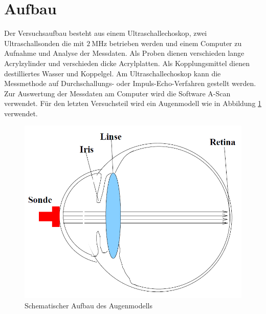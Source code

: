 \section{Aufbau}
\label{sec:Aufbau}

Der Versuchsaufbau besteht aus einem Ultraschallechoskop, zwei Ultraschallsonden die mit $\SI{2}{\mega\hertz}$ betrieben werden und einem Computer zu Aufnahme und Analyse der Messdaten. Als Proben dienen verschieden lange Acrylzylinder und verschieden dicke Acrylplatten. Als Kopplungsmittel dienen destilliertes Wasser und Koppelgel. Am Ultraschallechoskop kann die Messmethode auf Durchschallungs- oder Impuls-Echo-Verfahren gestellt werden. Zur Auswertung der Messdaten am Computer wird die Software A-Scan verwendet. Für den letzten Versuchsteil wird ein Augenmodell wie in Abbildung \ref{fig:Augenmodell} verwendet. 
\begin{figure}
\centering
\includegraphics[scale=0.3]{content/images/Augenmodell.jpg}
\caption{Schematischer Aufbau des Augenmodells \cite{US1}}
\label{fig:Augenmodell}
\end{figure}